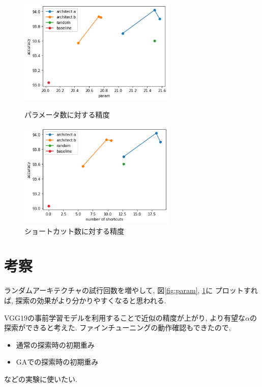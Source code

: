 \documentclass[twocolumn]{jarticle}     %
\begin{document}
\begin{figure}[tb]
 \begin{minipage}{0.5\hsize}
 	\begin{center}
 		\includegraphics[clip,width=75mm]{param.png}
 		\caption{パラメータ数に対する精度}
 		\label{fig:param}
 	\end{center}
 \end{minipage}
 \begin{minipage}{0.5\hsize}
 	\begin{center}
 		\includegraphics[clip,width=75mm]{short.png}
 		\caption{ショートカット数に対する精度}
 		\label{fig:short}
 	\end{center}
 \end{minipage}
\end{figure}


\section{考察}
ランダムアーキテクチャの試行回数を増やして, 図\ref{fig:param}, \ref{fig:short}に
プロットすれば, 探索の効果がより分かりやすくなると思われる.

VGG19の事前学習モデルを利用することで近似の精度が上がり,
より有望な$\alpha$の探索ができると考えた.
ファインチューニングの動作確認もできたので,
\begin{itemize}
  \item 通常の探索時の初期重み
  \item GAでの探索時の初期重み
\end{itemize}
などの実験に使いたい.
\end{document}
